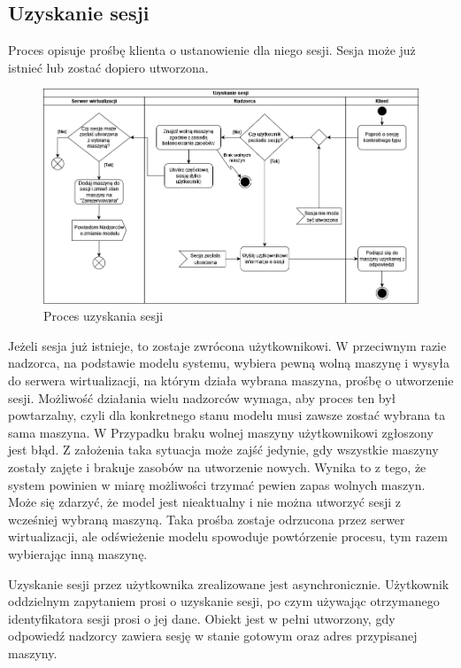 \documentclass[../opis-rozwiazania.tex]{subfiles}
\begin{document}
\label{diagrams:activity_diagrams}

\subsection{Uzyskanie sesji}

Proces opisuje prośbę klienta o ustanowienie dla niego sesji. Sesja może już istnieć lub zostać dopiero utworzona.

\begin{figure}[H]
  \centering
  \includegraphics[width=\textwidth]{../diagrams/activity_diagrams/uzyskanie_sesji_v2.png}
  \caption{Proces uzyskania sesji}
  \label{start_session}
\end{figure}

Jeżeli sesja już istnieje, to zostaje zwrócona użytkownikowi.
W przeciwnym razie nadzorca, na podstawie modelu systemu, wybiera pewną wolną maszynę i wysyła do serwera wirtualizacji, na którym działa wybrana maszyna, prośbę o utworzenie sesji. Możliwość działania wielu nadzorców wymaga, aby proces ten był powtarzalny, czyli dla konkretnego stanu modelu musi zawsze zostać wybrana ta sama maszyna.
W Przypadku braku wolnej maszyny użytkownikowi zgłoszony jest błąd.
Z założenia taka sytuacja może zajść jedynie, gdy wszystkie maszyny zostały zajęte i brakuje zasobów na utworzenie nowych. Wynika to z tego, że system powinien w miarę możliwości trzymać pewien zapas wolnych maszyn.
Może się zdarzyć, że model jest nieaktualny i nie można utworzyć sesji z wcześniej wybraną maszyną.
Taka prośba zostaje odrzucona przez serwer wirtualizacji, ale odświeżenie modelu spowoduje powtórzenie procesu, tym razem wybierając inną maszynę.

Uzyskanie sesji przez użytkownika zrealizowane jest asynchronicznie.
Użytkownik oddzielnym zapytaniem prosi o uzyskanie sesji, po czym używając otrzymanego identyfikatora sesji prosi o jej dane.
Obiekt jest w pełni utworzony, gdy odpowiedź nadzorcy zawiera sesję w stanie gotowym oraz adres przypisanej maszyny.
\end{document}
